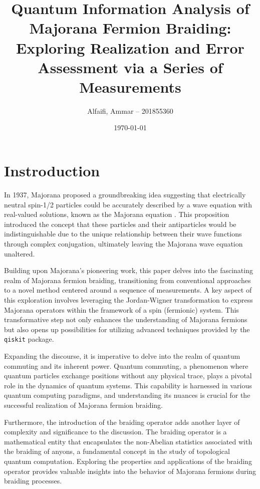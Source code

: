 \documentclass{article}
\title{Quantum Information Analysis of Majorana Fermion Braiding: Exploring Realization and Error Assessment via a Series of Measurements}
\author{Alfaifi, Ammar -- 201855360}
\date{\today}
\def\c#1{\texttt{#1}}
\begin{document}
\maketitle

\section{Instroduction} %
\label{sec:Instroduction}
In 1937, Majorana proposed a groundbreaking idea suggesting that electrically neutral spin-1/2 particles could be accurately described by a wave equation with real-valued solutions, known as the Majorana equation \cite{Majorana2006}. This proposition introduced the concept that these particles and their antiparticles would be indistinguishable due to the unique relationship between their wave functions through complex conjugation, ultimately leaving the Majorana wave equation unaltered.

Building upon Majorana's pioneering work, this paper delves into the fascinating realm of Majorana fermion braiding, transitioning from conventional approaches to a novel method centered around a sequence of measurements. A key aspect of this exploration involves leveraging the Jordan-Wigner transformation to express Majorana operators within the framework of a spin (fermionic) system. This transformative step not only enhances the understanding of Majorana fermions but also opens up possibilities for utilizing advanced techniques provided by the \c{qiskit} package.

Expanding the discourse, it is imperative to delve into the realm of quantum commuting and its inherent power. Quantum commuting, a phenomenon where quantum particles exchange positions without any physical trace, plays a pivotal role in the dynamics of quantum systems. This capability is harnessed in various quantum computing paradigms, and understanding its nuances is crucial for the successful realization of Majorana fermion braiding.

Furthermore, the introduction of the braiding operator adds another layer of complexity and significance to the discussion. The braiding operator is a mathematical entity that encapsulates the non-Abelian statistics associated with the braiding of anyons, a fundamental concept in the study of topological quantum computation. Exploring the properties and applications of the braiding operator provides valuable insights into the behavior of Majorana fermions during braiding processes.
\end{document}
